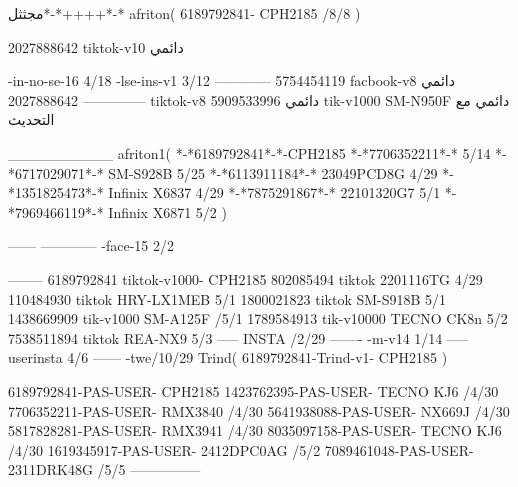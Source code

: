 مجثثل*-*++++*-*
afriton(
6189792841- CPH2185  /8/8
)

2027888642 tiktok-v10
دائمي

-in-no-se-16 4/18
-lse-ins-v1 3/12
------------
5754454119 facbook-v8
دائمي
--------------
2027888642 tiktok-v8
دائمي
5909533996 tik-v1000  SM-N950F
دائمي مع التحديث

__________
afriton1(
*-*6189792841*-*-CPH2185
*-*7706352211*-* 5/14
*-*6717029071*-*  SM-S928B 5/25
*-*6113911184*-* 23049PCD8G 4/29
*-*1351825473*-* Infinix X6837 4/29
*-*7875291867*-* 22101320G7 5/1
*-*7969466119*-* Infinix X6871 5/2
)


------
------------
-face-15 2/2

--------
6189792841 tiktok-v1000- CPH2185 
802085494 tiktok 2201116TG  4/29
110484930 tiktok HRY-LX1MEB  5/1
1800021823 tiktok SM-S918B  5/1
1438669909 tik-v1000 SM-A125F /5/1
1789584913 tik-v10000  TECNO CK8n 5/2
7538511894 tiktok REA-NX9  5/3
-----
 INSTA /2/29
-------
-m-v14 1/14
-----
userinsta 4/6
------
-twe/10/29
Trind(
6189792841-Trind-v1- CPH2185 
)

6189792841-PAS-USER- CPH2185 
1423762395-PAS-USER- TECNO KJ6 /4/30
7706352211-PAS-USER- RMX3840 /4/30
5641938088-PAS-USER- NX669J /4/30
5817828281-PAS-USER- RMX3941 /4/30
8035097158-PAS-USER- TECNO KJ6 /4/30
1619345917-PAS-USER- 2412DPC0AG /5/2
7089461048-PAS-USER- 2311DRK48G /5/5
    ---------------
